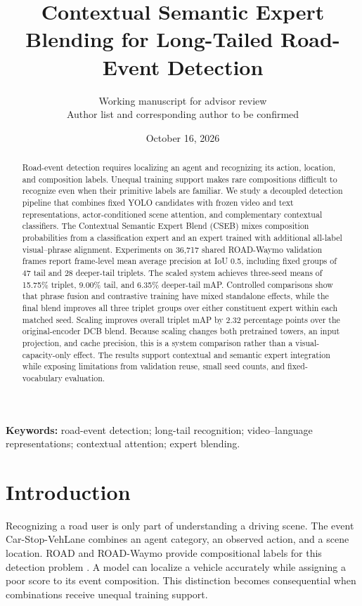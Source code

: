 \documentclass[11pt,letterpaper]{article}
\title{Contextual Semantic Expert Blending for Long-Tailed Road-Event Detection}
\author{Working manuscript for advisor review\\Author list and corresponding author to be confirmed}
\date{October 16, 2026}
\begin{document}
\maketitle
\begin{abstract}
Road-event detection requires localizing an agent and recognizing its action, location, and composition labels. Unequal training support makes rare compositions difficult to recognize even when their primitive labels are familiar. We study a decoupled detection pipeline that combines fixed YOLO candidates with frozen video and text representations, actor-conditioned scene attention, and complementary contextual classifiers. The Contextual Semantic Expert Blend (CSEB) mixes composition probabilities from a classification expert and an expert trained with additional all-label visual--phrase alignment. Experiments on 36,717 shared ROAD-Waymo validation frames report frame-level mean average precision at IoU 0.5, including fixed groups of 47 tail and 28 deeper-tail triplets. The scaled system achieves three-seed means of 15.75\% triplet, 9.00\% tail, and 6.35\% deeper-tail mAP. Controlled comparisons show that phrase fusion and contrastive training have mixed standalone effects, while the final blend improves all three triplet groups over either constituent expert within each matched seed. Scaling improves overall triplet mAP by 2.32 percentage points over the original-encoder DCB blend. Because scaling changes both pretrained towers, an input projection, and cache precision, this is a system comparison rather than a visual-capacity-only effect. The results support contextual and semantic expert integration while exposing limitations from validation reuse, small seed counts, and fixed-vocabulary evaluation.
\end{abstract}
\noindent\textbf{Keywords:} road-event detection; long-tail recognition; video--language representations; contextual attention; expert blending.

\section{Introduction}
Recognizing a road user is only part of understanding a driving scene. The event Car-Stop-VehLane combines an agent category, an observed action, and a scene location. ROAD and ROAD-Waymo provide compositional labels for this detection problem \cite{road,road-waymo}. A model can localize a vehicle accurately while assigning a poor score to its event composition. This distinction becomes consequential when combinations receive unequal training support.
\end{document}
